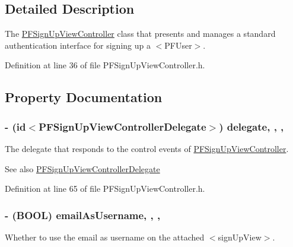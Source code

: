 \subsection{Detailed Description}
The {\ttfamily \hyperlink{interface_p_f_sign_up_view_controller}{P\+F\+Sign\+Up\+View\+Controller}} class that presents and manages a standard authentication interface for signing up a $<$\+P\+F\+User$>$. 

Definition at line 36 of file P\+F\+Sign\+Up\+View\+Controller.\+h.



\subsection{Property Documentation}
\hypertarget{interface_p_f_sign_up_view_controller_a1150c82d22998c1f83f712e1e60a386a}{}
\subsubsection[{delegate}]{\setlength{\rightskip}{0pt plus 5cm}-\/ (id$<${\bf P\+F\+Sign\+Up\+View\+Controller\+Delegate}$>$) delegate\hspace{0.3cm}{\ttfamily [read]}, {\ttfamily [write]}, {\ttfamily [nonatomic]}, {\ttfamily [weak]}}\label{interface_p_f_sign_up_view_controller_a1150c82d22998c1f83f712e1e60a386a}
The delegate that responds to the control events of {\ttfamily \hyperlink{interface_p_f_sign_up_view_controller}{P\+F\+Sign\+Up\+View\+Controller}}.

\begin{DoxySeeAlso}{See also}
\hyperlink{protocol_p_f_sign_up_view_controller_delegate-p}{P\+F\+Sign\+Up\+View\+Controller\+Delegate} 
\end{DoxySeeAlso}


Definition at line 65 of file P\+F\+Sign\+Up\+View\+Controller.\+h.

\hypertarget{interface_p_f_sign_up_view_controller_a90fe2f50758438dcc328bb9833ba6922}{}
\subsubsection[{email\+As\+Username}]{\setlength{\rightskip}{0pt plus 5cm}-\/ (B\+O\+O\+L) email\+As\+Username\hspace{0.3cm}{\ttfamily [read]}, {\ttfamily [write]}, {\ttfamily [nonatomic]}, {\ttfamily [assign]}}\label{interface_p_f_sign_up_view_controller_a90fe2f50758438dcc328bb9833ba6922}
Whether to use the email as username on the attached $<$sign\+Up\+View$>$.

